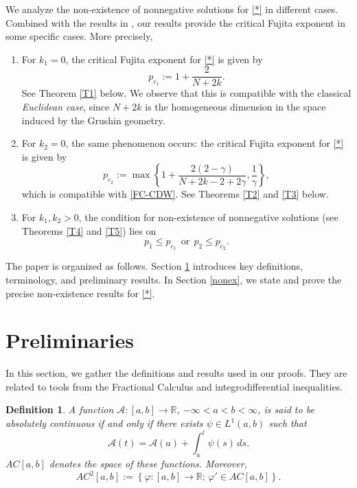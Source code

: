 \documentclass[reqno,11pt]{amsart}
\newtheorem{definition}{Definition}[section]
\numberwithin{equation}{section}
\begin{document}
We analyze the non-existence of nonnegative solutions for \eqref{*} in different cases. Combined with the results in \cite{Fino-Viana-25.1}, our results provide the critical Fujita exponent \cite{Fujita} in some specific cases. More precisely,
\begin{enumerate}
	\item For $k_1=0$, the critical Fujita exponent for \eqref{*} is given by
	$$
	p_{c_1} := 1+\frac{2}{N+2k} .
	$$
	See Theorem \ref{T1} below. We observe that this is compatible with the classical \textit{Euclidean case}, since $N+2k$ is the homogeneous dimension in the space induced by the Grushin geometry.
	
	
	\item For $k_2=0$, the same phenomenon occurs: the critical Fujita exponent for \eqref{*} is given by
	$$p_{c_2} := \max\left\{ 1+\frac{2(2-\gamma)}{N+2k-2+2\gamma} , \frac{1}{\gamma} \right\},$$
	which is compatible with \eqref{FC-CDW}. See Theorems \ref{T2} and \ref{T3} below.
	
	
	\item For $k_1,k_2>0$, the condition for non-existence of nonnegative solutions (see Theorems \ref{T4} and \ref{T5}) lies on
	$$p_1 \leq p_{c_1} \ \ \mbox{or} \ \ p_2 \leq p_{c_2} . $$
	
\end{enumerate} 

The paper is organized as follows. Section \ref{pre} introduces key definitions, terminology, and preliminary results. In Section \ref{nonex}, we state and prove the precise non-existence results for \eqref{*}. 


\section{Preliminaries}\label{pre}
In this section, we gather the definitions and results used in our proofs. They are related to tools from the Fractional Calculus and integrodifferential inequalities.


\begin{definition}
	A function $\mathcal{A} :[a,b]\rightarrow\mathbb{R}$, $-\infty<a<b<\infty$, is said to be absolutely continuous if and only if there exists $\psi\in L^1(a,b)$ such that
	\[
	\mathcal{A} (t)=\mathcal{A} (a)+\int_{a}^t \psi(s)\,ds.
	\]
	$AC[a,b]$ denotes the space of these functions.  Moreover,
\[
	AC^2[a,b]:=\left\{\varphi:[a,b]\rightarrow\mathbb{R};\,\varphi'\in AC[a,b]\right\}.
	\]
\end{definition}
\end{document}
